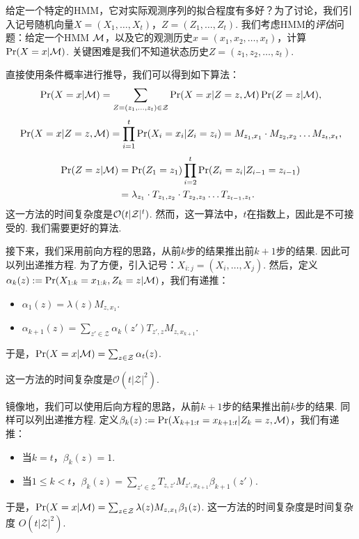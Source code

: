 给定一个特定的HMM，它对实际观测序列的拟合程度有多好？为了讨论，我们引入记号随机向量$X=(X_1,\dots,X_t)$，$Z=(Z_1,\dots,Z_t)$. 我们考虑HMM的\emph{评估}问题：给定一个HMM $\mathcal M$，以及它的观测历史$x=(x_1,x_2,\dots,x_t)$，计算$\Pr(X=x|\mathcal M)$. 关键困难是我们不知道状态历史$Z=(z_1,z_2,\dots,z_t)$.

直接使用条件概率进行推导，我们可以得到如下算法：
    \[
        \Pr(X=x|\mathcal M) =\sum_{Z=(z_1, \dots, z_t) \in \mathcal Z} \Pr(X=x|Z=z, \mathcal M)\Pr(Z=z|\mathcal M),
    \]
    \[
        \Pr(X=x|Z=z,\mathcal M) = \prod_{i=1}^t \Pr(X_i = x_i| Z_i = z_i) = M_{z_1,x_1}\cdot M_{z_2,x_2}\dots M_{z_t,x_t},
    \]
    \begin{align*}
        \Pr(Z=z|\mathcal M) &= \Pr(Z_1 = z_1) \prod_{i=2}^t\Pr(Z_i = z_i| Z_{i-1} = z_{i-1}) 
        \\
        &= \lambda_{z_1}\cdot T_{z_1,z_2}\cdot T_{z_2,z_3}\dots T_{z_{t-1},z_t}.
    \end{align*}
这一方法的时间复杂度是$\mathcal{O}(t|\mathcal Z|^t)$. 然而，这一算法中，$t$在指数上，因此是不可接受的. 我们需要更好的算法.

接下来，我们采用前向方程的思路，从前$k$步的结果推出前$k+1$步的结果. 因此可以列出递推方程. 为了方便，引入记号：$X_{i:j}=(X_i,\dots,X_j)$. 然后，定义$\alpha_k(z):= \Pr(X_{1:k}=x_{1:k}, Z_k=z| \mathcal M)$，我们有递推：
    \begin{itemize}
        \item $\alpha_1(z) = \lambda(z)M_{z,x_1}$.
        \item $\alpha_{k+1}(z) = \sum_{z' \in \mathcal Z}\alpha_{k}(z')T_{z',z}M_{z,x_{k+1}}$.
    \end{itemize}
于是，$\Pr(X=x| \mathcal M) = \sum_{z\in \mathcal Z}\alpha_t(z)$.

这一方法的时间复杂度是$\mathcal O(t|\mathcal Z|^2)$.

镜像地，我们可以使用后向方程的思路，从前$k+1$步的结果推出前$k$步的结果. 同样可以列出递推方程. 定义$\beta_k(z):=\Pr(X_{k+1:t}=x_{k+1:t} | Z_k=z,\mathcal M)$，我们有递推：
\begin{itemize}
    \item 当$k = t$，$\beta_k(z) = 1$.
    \item 当$1 \le k < t$，$\beta_{k}(z) = \sum_{z' \in \mathcal Z}T_{z,z'}M_{z',x_{k+1}}\beta_{k+1}(z')$.
\end{itemize}
于是，$\Pr(X=x| \mathcal M) = \sum_{z\in \mathcal Z}\lambda(z)M_{z,x_1}\beta_1(z)$.
这一方法的时间复杂度是时间复杂度 $O(t|\mathcal Z|^2)$.


